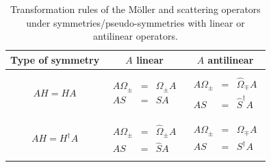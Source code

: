 \begin{table}
  \caption{Transformation rules of the M\"oller and scattering operators under symmetries/pseudo-symmetries with linear or antilinear operators.}
  \label{tab:chapter1_MollerOperatorSymmetries}
  \centering
  \begin{tabular}{c|cc}
  \textbf{Type of symmetry} & \textbf{$A$ linear} & \textbf{$A$ antilinear}

  \\
  \hline
  $A H = H A$
  &
  $
  \begin{array}{ccc}
    &&
    \\
    A \Omega_{\pm}&=&\Omega_{\pm} A
    \\
    A S&=&S A
    \\
    &&
  \end{array}
  $
  &
  $
  \begin{array}{ccc}
    &&
    \\
    A \Omega_{\pm}&=&\widehat{\Omega}_{\mp} A
    \\
    A S&=&\widehat{S}^\dagger A
    \\
    &&
  \end{array}
  $
  \\
  $A H = H^\dagger A$
  &
  $
  \begin{array}{ccc}
    &&
    \\
    A \Omega_{\pm}&=&\widehat{\Omega}_{\pm} A
    \\
    A S&=&\widehat{S} A
    \\
    &&
  \end{array}
  $
  &
  $
  \begin{array}{ccc}
    &&
    \\
    A \Omega_{\pm}&=&\Omega_{\mp} A
    \\
    A S&=&S^\dagger A
    \\
    &&
  \end{array}
  $
  \\
  \end{tabular}
\end{table}

